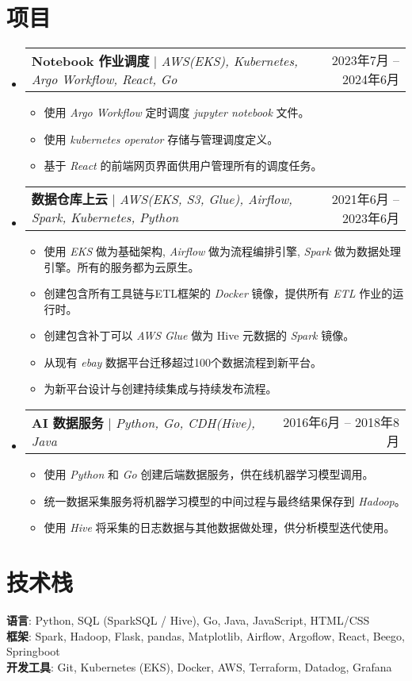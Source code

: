 \documentclass[a4paper,11pt]{article}
\makeatletter
\newcommand{\resumeItem}[1]{
  \item\small{
    {#1 \vspace{-2pt}}
  }
}
\newcommand{\resumeProjectHeading}[2]{
    \item
    \begin{tabular*}{0.97\textwidth}{l@{\extracolsep{\fill}}r}
      \small#1 & #2 \\
    \end{tabular*}\vspace{-7pt}
}
\newcommand{\resumeSubHeadingListStart}{\begin{itemize}[leftmargin=0.15in, label={}]}
\newcommand{\resumeSubHeadingListEnd}{\end{itemize}}
\newcommand{\resumeItemListStart}{\begin{itemize}}
\newcommand{\resumeItemListEnd}{\end{itemize}\vspace{-5pt}}
\makeatother
\begin{document}
\section{项目}
    \resumeSubHeadingListStart
      \resumeProjectHeading
          {\textbf{Notebook 作业调度} $|$ \emph{AWS(EKS), Kubernetes, Argo Workflow, React, Go}}{2023年7月 -- 2024年6月}
          \resumeItemListStart
            \resumeItem{使用 \emph{Argo Workflow} 定时调度 \emph{jupyter notebook} 文件。}
            \resumeItem{使用 \emph{kubernetes operator} 存储与管理调度定义。}
            \resumeItem{基于 \emph{React} 的前端网页界面供用户管理所有的调度任务。}
          \resumeItemListEnd
      \resumeProjectHeading
          {\textbf{数据仓库上云} $|$ \emph{AWS(EKS, S3, Glue), Airflow, Spark, Kubernetes, Python}}{2021年6月 -- 2023年6月}
          \resumeItemListStart
            \resumeItem{使用 \emph{EKS} 做为基础架构, \emph{Airflow} 做为流程编排引擎, \emph{Spark} 做为数据处理引擎。所有的服务都为云原生。}
            \resumeItem{创建包含所有工具链与ETL框架的 \emph{Docker} 镜像，提供所有 \emph{ETL} 作业的运行时。}
            \resumeItem{创建包含补丁可以 \emph{AWS Glue} 做为 Hive 元数据的 \emph{Spark} 镜像。}
            \resumeItem{从现有 \emph{ebay} 数据平台迁移超过100个数据流程到新平台。}
            \resumeItem{为新平台设计与创建持续集成与持续发布流程。}
          \resumeItemListEnd
      \resumeProjectHeading
          {\textbf{AI 数据服务} $|$ \emph{Python, Go, CDH(Hive), Java}}{2016年6月 -- 2018年8月}
          \resumeItemListStart
            \resumeItem{使用 \emph{Python} 和 \emph{Go} 创建后端数据服务，供在线机器学习模型调用。}
            \resumeItem{统一数据采集服务将机器学习模型的中间过程与最终结果保存到 \emph{Hadoop}。}
            \resumeItem{使用 \emph{Hive} 将采集的日志数据与其他数据做处理，供分析模型迭代使用。}
          \resumeItemListEnd
    \resumeSubHeadingListEnd


%
\section{技术栈}
 \begin{itemize}[leftmargin=0.15in, label={}]
    \small{\item{
     \textbf{语言}{: Python, SQL (SparkSQL / Hive), Go, Java, JavaScript, HTML/CSS} \\
     \textbf{框架}{: Spark, Hadoop, Flask, pandas, Matplotlib, Airflow, Argoflow, React, Beego, Springboot } \\
     \textbf{开发工具}{: Git, Kubernetes (EKS), Docker, AWS, Terraform, Datadog, Grafana} \\
    }}
 \end{itemize}


\end{document}

